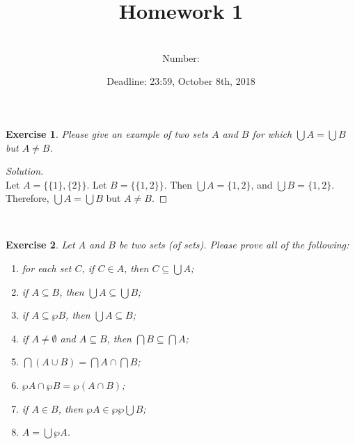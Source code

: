 \documentclass[12pt,a4paper,utf8]{article}
\title{Homework 1}
\author{\\
Number: }
\date{Deadline: 23:59, October 8th, 2018}
\theoremstyle{plain}
\newtheorem{exercise}{Exercise}
\begin{document}
\maketitle

\begin{exercise}
Please give an example of two sets $A$ and $B$ for which $\bigcup A = \bigcup B$ but $A \neq B$. 
\end{exercise}

\begin{proof}[Solution]\ \\
Let $A=\{\{1\},\{2\}\}$. 
Let $B=\{\{1,2\}\}$. 
Then $\bigcup A =\{1,2\}$, and $\bigcup B=\{1,2\}$. 
Therefore,  $\bigcup A = \bigcup B$ but $A \neq B$. 

\end{proof}

\ \\
\begin{exercise}
Let $A$ and $B$ be two sets (of sets).
Please prove all of the following:
%
\begin{enumerate}

\item for each set $C$, if $C \in A$, then $C \subseteq \bigcup A$;

\item if $A \subseteq B$, then $\bigcup A \subseteq \bigcup B$;

\item if $A \subseteq \wp B$, then $\bigcup A \subseteq B$;

\item if $A \neq \emptyset$ and $A \subseteq B$, then $\bigcap B \subseteq \bigcap A$;

\item $\bigcap ( A \cup B ) = \bigcap A \cap \bigcap B$;

\item $\wp A \cap \wp B = \wp (A \cap B)$;

\item if $A \in B$, then $\wp A \in \wp \wp \bigcup B$;

\item $A = \bigcup \wp A$.

\end{enumerate}
\end{exercise}
\end{document}
